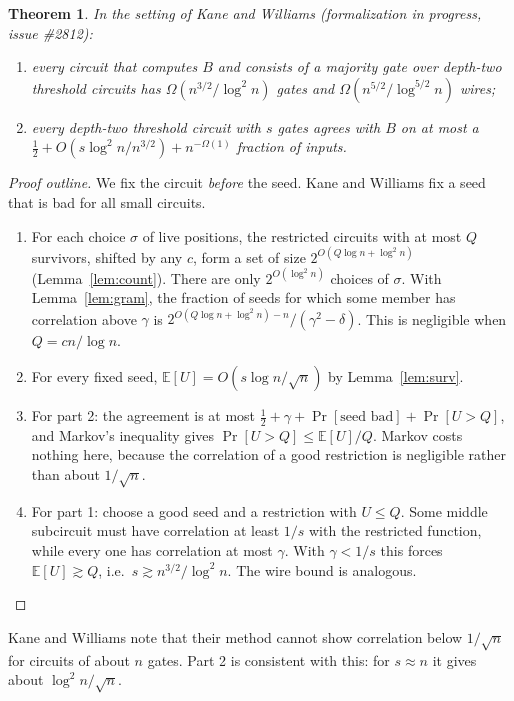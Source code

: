 \documentclass[11pt,letterpaper]{article}
\newtheorem{theorem}{Theorem}
\begin{document}
\begin{theorem}\label{thm:B}
In the setting of Kane and Williams (formalization in progress, issue \#2812):
\begin{enumerate}
\item every circuit that computes $B$ and consists of a majority gate over
      depth-two threshold circuits has $\Omega(n^{3/2}/\log^2n)$ gates and
      $\Omega(n^{5/2}/\log^{5/2}n)$ wires;
\item every depth-two threshold circuit with $s$ gates agrees with $B$ on at
      most a $\tfrac12+O(s\log^2n/n^{3/2})+n^{-\Omega(1)}$ fraction of
      inputs.
\end{enumerate}
\end{theorem}
\begin{proof}[Proof outline]
We fix the circuit \emph{before} the seed. Kane and Williams fix a seed that
is bad for all small circuits.
\begin{enumerate}
\item For each choice $\sigma$ of live positions, the restricted circuits
      with at most $Q$ survivors, shifted by any $c$, form a set of size
      $2^{O(Q\log n+\log^2 n)}$ (Lemma~\ref{lem:count}). There are only
      $2^{O(\log^2n)}$ choices of $\sigma$. With Lemma~\ref{lem:gram}, the
      fraction of seeds for which some member has correlation above $\gamma$
      is $2^{O(Q\log n+\log^2 n)-n}/(\gamma^2-\delta)$. This is negligible
      when $Q=cn/\log n$.
\item For every fixed seed, $\mathbb E[U]=O(s\log n/\sqrt n)$ by
      Lemma~\ref{lem:surv}.
\item For part 2: the agreement is at most
      $\tfrac12+\gamma+\Pr[\text{seed bad}]+\Pr[U>Q]$, and Markov's
      inequality gives $\Pr[U>Q]\le\mathbb E[U]/Q$. Markov costs nothing
      here, because the correlation of a good restriction is negligible
      rather than about $1/\sqrt n$.
\item For part 1: choose a good seed and a restriction with $U\le Q$. Some
      middle subcircuit must have correlation at least $1/s$ with the
      restricted function, while every one has correlation at most $\gamma$.
      With $\gamma<1/s$ this forces $\mathbb E[U]\gtrsim Q$, i.e.\
      $s\gtrsim n^{3/2}/\log^2 n$. The wire bound is analogous.
\end{enumerate}
\end{proof}
Kane and Williams note that their method cannot show correlation below
$1/\sqrt n$ for circuits of about $n$ gates. Part 2 is consistent with this:
for $s\approx n$ it gives about $\log^2n/\sqrt n$.
\end{document}
